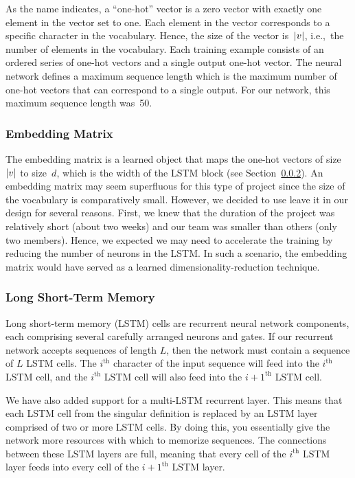 \documentclass{article}
\DeclarePairedDelimiter\abs{\lvert}{\rvert}%
\begin{document}
As the name indicates, a ``one-hot'' vector is a zero vector with exactly one element in the vector set to one.  Each element in the vector corresponds to a specific character in the vocabulary.  Hence, the size of the vector is~$\abs*{v}$, i.e.,~the number of elements in the vocabulary. Each training example consists of an ordered series of one-hot vectors and a single output one-hot vector.  The neural network defines a maximum sequence length which is the maximum number of one-hot vectors that can correspond to a single output.  For our network, this maximum sequence length was~50.

\subsubsection{Embedding Matrix}

The embedding matrix is a learned object that maps the one-hot vectors of size~$\abs*{v}$ to size~$d$, which is the width of the LSTM block (see Section~\ref{sec:lstm}).  An embedding matrix may seem superfluous for this type of project since the size of the vocabulary is comparatively small.  However, we decided to use leave it in our design for several reasons.  First, we knew that the duration of the project was relatively short (about two weeks) and our team was smaller than others (only two members).  Hence, we expected we may need to accelerate the training by reducing the number of neurons in the LSTM.  In such a scenario, the embedding matrix would have served as a learned dimensionality-reduction technique.


\subsubsection{Long Short-Term Memory}\label{sec:lstm}

Long short-term memory (LSTM) cells are recurrent neural network components, each comprising several carefully arranged neurons and gates. If our recurrent network accepts sequences of length $L$, then the network must contain a sequence of $L$ LSTM cells. The $i^{\text{th}}$ character of the input sequence will feed into the $i^{\text{th}}$ LSTM cell, and the $i^{\text{th}}$ LSTM cell will also feed into the $i+1^{\text{th}}$ LSTM cell.

We have also added support for a multi-LSTM recurrent layer. This means that each LSTM cell from the singular definition is replaced by an LSTM layer comprised of two or more LSTM cells. By doing this, you essentially give the network more resources with which to memorize sequences. The connections between these LSTM layers are full, meaning that every cell of the $i^{\text{th}}$ LSTM layer feeds into every cell of the $i+1^{\text{th}}$ LSTM layer.
\end{document}

